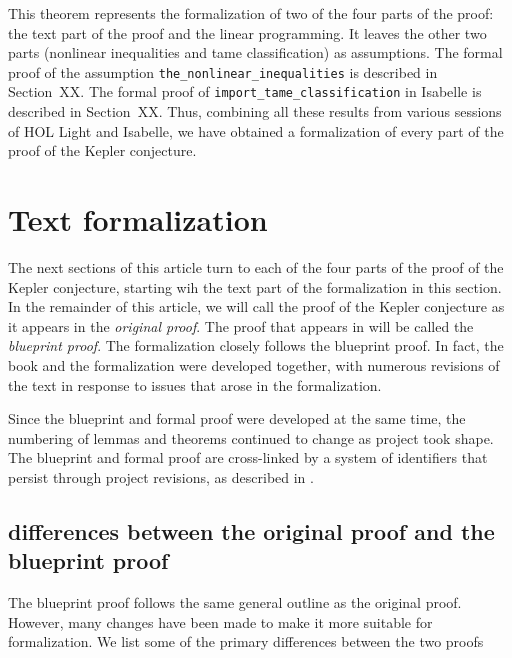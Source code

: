 This theorem represents the formalization of two of the four parts of
the proof: the text part of the proof and the linear programming.  It
leaves the other two parts (nonlinear inequalities and tame
classification) as assumptions.  The formal proof of the assumption
\verb!the_nonlinear_inequalities! is
described in Section~XX.  The formal proof of
\verb!import_tame_classification! in Isabelle is
described in Section~XX.
Thus, combining all these results from various
sessions of HOL Light and Isabelle, we have obtained a formalization
of every part of the proof of the Kepler conjecture.



\section{Text formalization}


The next sections of this article turn to each of the four parts of
the proof of the Kepler conjecture, starting wih the text part of the
formalization in this section.  In the remainder of this article, we
will call the proof of the Kepler conjecture as it appears in
\cite{DCG} the {\it original proof}.
The proof that appears in \cite{XX} will be called the {\it blueprint
  proof}.  The formalization closely follows the blueprint proof.  In
fact, the book and the formalization were developed together, with
numerous revisions of the text in response to issues that arose in the
formalization.

Since the blueprint and formal proof were developed at the same time,
the numbering of lemmas and theorems continued to change as project
took shape.  The blueprint and formal proof are cross-linked by a
system of identifiers that persist through project revisions, as
described in \cite{Urban XX}.



\subsection{differences between the original proof and the blueprint proof}

The blueprint proof follows the same general outline as the original
proof.  However, many changes have been made to make it more suitable
for formalization.  We list some of the primary differences between
the two proofs

